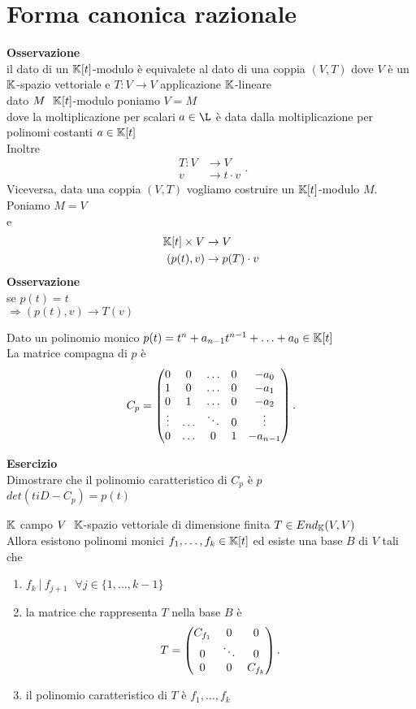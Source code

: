 \documentclass[12px]{article}
\begin{document}
	\section{Forma canonica razionale}
	\textbf{Osservazione}\\
	il dato di un $\mathbb{K}[t]$-modulo è equivalete al dato di una coppia $(V,T)$ dove  $V$ è un $\mathbb{K}$-spazio vettoriale e $T:V \rightarrow V$ applicazione $\mathbb{K}$-lineare\\
	dato $M\ \ \mathbb{K}[t]$-modulo poniamo  $V =M$ \\
	dove la moltiplicazione per scalari $a\in \L$ è data dalla moltiplicazione per polinomi costanti  $a\in \mathbb{K}[t]$\\
Inoltre
 \[
\begin{aligned}
	T: V & \rightarrow V\\
	v & \rightarrow t\cdot v
\end{aligned}
.\] 
Viceversa, data una coppia $(V,T)$ vogliamo costruire un  $\mathbb{K}[t]$-modulo $M$.\\
Poniamo  $M = V$\\
e\\
\[
	\begin{aligned}
		\mathbb{K}[t]\times V &\rightarrow V\\
		(p(t),v) & \rightarrow p(T)\cdot v
	\end{aligned}
\]
\textbf{Osservazione}\\
se $p(t) = t$\\
$ \Rightarrow  (p(t),v) \rightarrow T(v)$ 
\begin{defi}
	Dato un polinomio monico $p(t) = t^n + a_{n-1} t^{n-1} + \ldots + a_0\in \mathbb{K}[t]$\\
	La matrice compagna di  $p$ è
	 \[
		 C_p = \begin{pmatrix}0 & 0 & \ldots & 0 & -a_0\\
			 1 & 0 & \ldots  & 0 & -a_1\\
			 0 & 1 & \ldots & 0& -a_2\\
			 \vdots & \ldots & \ddots & 0 & \vdots\\
0 & \ldots & 0 &1 & -a_{n-1}\end{pmatrix}
	.\] 
\end{defi}
\textbf{Esercizio}\\
Dimostrare che il polinomio caratteristico di $C_p$ è $p$ \\
$ det(t iD - C_p)= p(t)$ \\
\begin{teo}
	$\mathbb{K}$ campo $V\ \ \mathbb{K}$-spazio vettoriale di dimensione finita $T\in End_{\mathbb{K}} (V,V)$\\
	Allora esistono polinomi monici  $f_1,\ldots, f_k\in\mathbb{K}[t]$ ed esiste una base $B$ di $V$ tali che
	 \begin{enumerate}
		 \item $f_k\ | \ f_{j+1} \ \ \ \forall j\in\{1,\ldots,k-1\}$
		 \item la matrice che rappresenta  $T$ nella base $B$ è 
			 \[
				 T = \begin{pmatrix}C_{f_1} & 0 & 0\\ 0 &\ddots & 0 \\
				 0 & 0 & C_{f_k}\end{pmatrix}
			 .\] 
		 \item il polinomio caratteristico di $T$ è $f_1,\ldots,f_k$
	\end{enumerate}
\end{teo}
\end{document}
